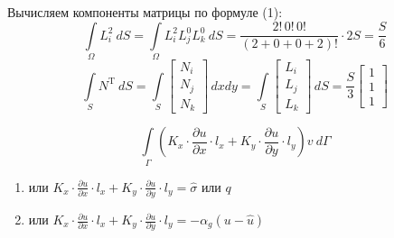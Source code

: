 	Вычисляем компоненты матрицы по формуле (1):
	\[
	\int\limits_{\Omega} L_i^2 \ dS = \int\limits_{\Omega} L_i^2L_j^0L_k^0 \ dS=  \dfrac{2!\, 0!\, 0!}{(2+0+0+2)!}\cdot 2S=\frac{S}{6}
	\]
	\[
	\int\limits_SN^{\text{T}} \ dS = \int\limits_S \begin{bmatrix}
		N_i \\ N_j \\ N_k
	\end{bmatrix} \, dxdy = \int\limits_S \begin{bmatrix}
	L_i \\ L_j \\ L_k
	\end{bmatrix} \, dS = \frac{S}{3} \begin{bmatrix}
	1 \\ 1 \\ 1
	\end{bmatrix}
	\]
	
	\[
	\int\limits_{\Gamma} \left(K_x \cdot  \frac{\partial u}{\partial x} \cdot l_x + K_y \cdot  \frac{\partial u}{\partial y} \cdot l_y \right)v\ d\Gamma 
	\]
	\begin{enumerate}
		\item или $K_x \cdot  \frac{\partial u}{\partial x} \cdot l_x + K_y \cdot  \frac{\partial u}{\partial y} \cdot l_y=\hat\sigma$ или $q$ 
		\item или $K_x \cdot  \frac{\partial u}{\partial x} \cdot l_x + K_y \cdot  \frac{\partial u}{\partial y} \cdot l_y=-\alpha_g(u-\hat u)$ 
	\end{enumerate}
	
